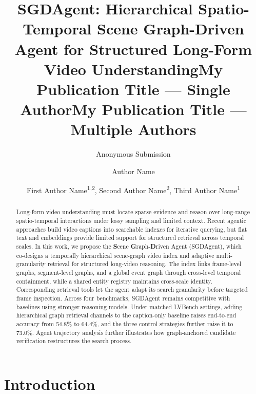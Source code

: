 \documentclass[letterpaper]{article} %
\title{SGDAgent: Hierarchical Spatio-Temporal Scene Graph-Driven Agent for Structured Long-Form Video Understanding}
\author{
    Anonymous Submission
}
\title{My Publication Title --- Single Author}
\author {
    Author Name
}
\title{My Publication Title --- Multiple Authors}
\author {
    First Author Name\textsuperscript{\rm 1,\rm 2}\equalcontrib,
    Second Author Name\textsuperscript{\rm 2}\equalcontrib,
    Third Author Name\textsuperscript{\rm 1}\corresponding
}
\begin{document}
\maketitle

\begin{abstract}
Long-form video understanding must locate sparse evidence and reason over long-range spatio-temporal interactions under lossy sampling and limited context.
Recent agentic approaches build video captions into searchable indexes for iterative querying, but flat text and embeddings provide limited support for structured retrieval across temporal scales.
In this work, we propose the \textbf{S}cene \textbf{G}raph-\textbf{D}riven Agent (SGDAgent), which co-designs a temporally hierarchical scene-graph video index and adaptive multi-granularity retrieval for structured long-video reasoning.
The index links frame-level graphs, segment-level graphs, and a global event graph through cross-level temporal containment, while a shared entity registry maintains cross-scale identity.
Corresponding retrieval tools let the agent adapt its search granularity before targeted frame inspection.
Across four benchmarks, SGDAgent remains competitive with baselines using stronger reasoning models.
Under matched LVBench settings, adding hierarchical graph retrieval channels to the caption-only baseline raises end-to-end accuracy from 54.8\% to 64.4\%, and the three control strategies further raise it to 73.0\%.
Agent trajectory analysis further illustrates how graph-anchored candidate verification restructures the search process.
\end{abstract}


\section{Introduction}
\label{sec:intro}

\end{document}
